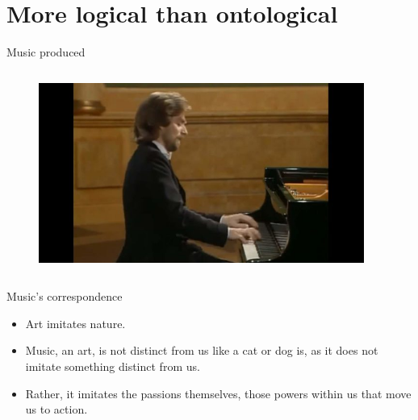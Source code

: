 \documentclass[xcolor=dvipsnames]{beamer}
\begin{document}
\section{More logical than ontological}


\begin{frame}[fragile]{Music produced}
  \begin{columns}[T] %
    \begin{column}{0.99\textwidth}
      \begin{figure}[H]
        \centering
        \includegraphics[width=0.95\textwidth]{zimerman}
      \end{figure}
    \end{column}%
  \end{columns}
\end{frame}

\begin{frame}[fragile]{Music's correspondence}
  \begin{itemize}
      \item Art imitates nature. \vspace{5mm}
  \item Music, an art, is not distinct from us like a cat or dog is, as it does not imitate something distinct from us.\vspace{5mm}
    \item Rather, it imitates the passions themselves, those powers within us that move us to action.\vspace{5mm}
  \end{itemize}
\end{frame}
\end{document}
